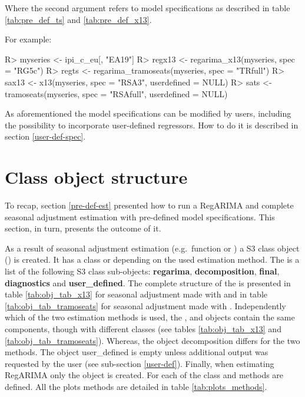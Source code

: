 \documentclass[article]{jss}
\begin{document}
Where the second argument refers to model specifications as described in
table \ref{tab:pre_def_ts} and \ref{tab:pre_def_x13}.

For example:

\begin{CodeChunk}

\begin{CodeInput}
R> myseries <- ipi_c_eu[, "EA19"]
R> regx13 <- regarima_x13(myseries, spec = "RG5c")
R> regts <- regarima_tramoseats(myseries, spec = "TRfull")
R> sax13 <- x13(myseries, spec = "RSA3", userdefined = NULL)
R> sats <- tramoseats(myseries, spec = "RSAfull", userdefined = NULL)
\end{CodeInput}
\end{CodeChunk}

As aforementioned the model specifications can be modified by users,
including the possibility to incorporate user-defined regressors. How to
do it is described in section \ref{user-def-spec}.

\hypertarget{sa-obj-struc}{%
\section{Class object structure}\label{sa-obj-struc}}

To recap, section \ref{pre-def-est} presented how to run a RegARIMA and
complete seasonal adjustment estimation with pre-defined model
specifications. This section, in turn, presents the outcome of it.

As a result of seasonal adjustment estimation (e.g.~function 
or ) a S3 class object () is created.
It has a class  or 
depending on the used estimation method. The  is a list
of the following S3 class sub-objects: \textbf{regarima},
\textbf{decomposition}, \textbf{final}, \textbf{diagnostics} and
\textbf{user\_defined}. The complete structure of the 
is presented in table \ref{tab:obj_tab_x13} for seasonal adjustment made
with  and in table \ref{tab:obj_tab_tramoseats} for seasonal
adjustment made with . Independently which of the two
estimation methods is used, the ,  and
 objects contain the same components, though with
different classes (see tables \ref{tab:obj_tab_x13} and
\ref{tab:obj_tab_tramoseats}). Whereas, the object decomposition differs
for the two methods. The object user\_defined is empty unless additional
output was requested by the user (see sub-section \ref{user-def}).
Finally, when estimating RegARIMA only the  object is
created. For each of the class  and  methods are
defined. All the plots methods are detailed in table
\ref{tab:plots_methods}.
\end{document}
